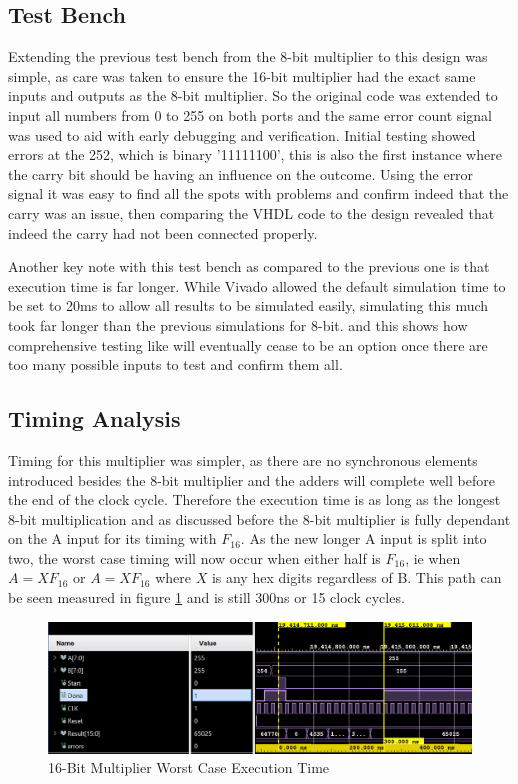 \documentclass[11pt]{article}
\begin{document}
\subsection{Test Bench}
Extending the previous test bench from the 8-bit multiplier to this design was simple,
as care was taken to ensure the 16-bit multiplier had the exact same inputs and outputs as the 8-bit multiplier.
So the original code was extended to input all numbers from 0 to 255 on both ports and the same error count signal was used to aid with early debugging and verification.
Initial testing showed errors at the 252, which is binary '11111100', this is also the first instance where the carry bit should be having an influence on the outcome.
Using the error signal it was easy to find all the spots with problems and confirm indeed that the carry was an issue,
then comparing the VHDL code to the design revealed that indeed the carry had not been connected properly.

Another key note with this test bench as compared to the previous one is that execution time is far longer.
While Vivado allowed  the default simulation time to be set to 20ms to allow all results to be simulated easily, 
simulating this much took far longer than the previous simulations for 8-bit. 
and this shows how comprehensive testing like will eventually cease to be an option once there are too many possible inputs to test and confirm them all.

\subsection{Timing Analysis}
Timing for this multiplier was simpler, as there are no synchronous elements introduced besides the 8-bit multiplier and the adders will complete well before the end of the clock cycle.
Therefore the execution time is as long as the longest 8-bit multiplication and as discussed before the 8-bit multiplier is fully dependant on the A input for its timing with $F_{16}$.
As the new longer A input is split into two, the worst case timing will now occur when either half is $F_{16}$, ie when $A = XF_{16}$ or $A = XF_{16}$ where $X$ is any hex digits regardless of B.
This path can be seen measured in figure \ref{fig:8bit_worst} and is still 300ns or 15 clock cycles.

\begin{figure}[H]         
    \centering
    \includegraphics[width=\textwidth]{16bit_worst.png}
    \caption{16-Bit Multiplier Worst Case Execution Time}
    \label{fig:8bit_worst}
\end{figure} 
\end{document}
